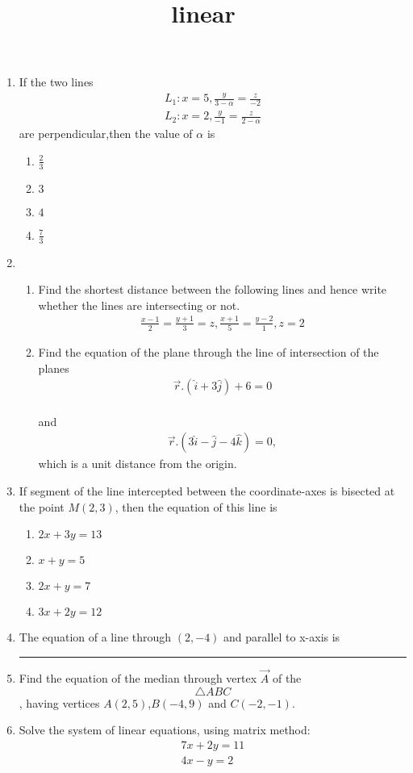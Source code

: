 \documentclass{article}
\title{linear}
\begin{document}
\begin{enumerate}
	\item If the two lines
	\begin{align}	
		L_{1} : x=5, \frac{y}{3-\alpha} = \frac{z}{-2}
   		\\L_{2}: x=2, \frac{y}{-1} = \frac{z}{2-\alpha}
	\end{align}
   	 are perpendicular,then the value of $\alpha$ is
   	\begin{enumerate}%
   		\item $\frac{2}{3}$
		\item $3$
		\item $4$
		\item $\frac{7}{3}$
	\end{enumerate}
	\item \begin{enumerate} %
	\item Find the shortest distance between the following lines and hence write whether the lines are intersecting or not.
	\begin{align}
		\frac{x-1}{2} = \frac{y+1}{3}=z,
		\frac{x+1}{5} = \frac{y-2}{1}, 
		z=2
	\end{align}
	\item Find the equation of the plane through the line of intersection of the planes 
		\begin{align}
			\vec{r}. (\hat{i}+3\hat{j}) + 6 = 0
		\end{align}
			\\and
			\begin{align}
				\vec{r} .(3\hat{i}-\hat{j}-4\hat{k}) = 0,
			\end{align}
			which is a unit distance from the origin.
	\end{enumerate}
\item If segment of the line intercepted between the coordinate-axes is bisected at the point $M(2,3)$, then the equation of this line is
		\begin{enumerate}%
			\item $2x + 3y = 13$
			\item $x+y = 5$
			\item $2x + y = 7$
			\item $3x + 2y = 12$
		\end{enumerate}
	\item The equation of a line through $(2,-4)$ and parallel to x-axis is\rule{1cm}{0.15mm}
	\item Find the equation of the median through vertex $\vec{A}$ of the $$\triangle{ABC}$$, having vertices $A(2,5)$,$B(-4,9)$ and $C(-2,-1)$.
	\item Solve the system of linear equations, using matrix method:
		\begin{align}	
			7x+2y = 11
			\\4x-y = 2
		\end{align}
\end{enumerate}
\end{document}
